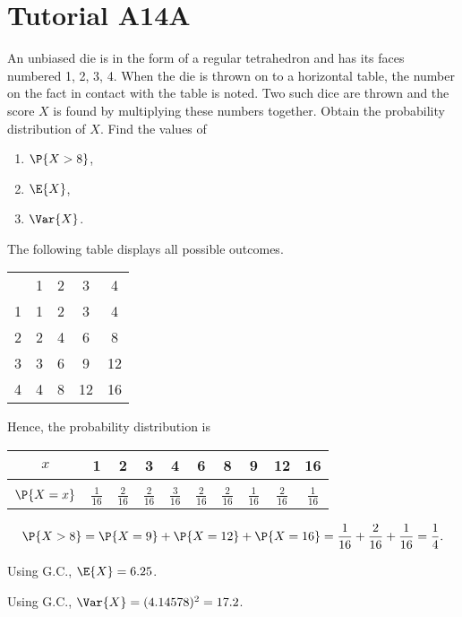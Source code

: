 \section{Tutorial A14A}

\begin{problem}
    An unbiased die is in the form of a regular tetrahedron and has its faces numbered 1, 2, 3, 4. When the die is thrown on to a horizontal table, the number on the fact in contact with the table is noted. Two such dice are thrown and the score $X$ is found by multiplying these numbers together. Obtain the probability distribution of $X$. Find the values of
    \begin{enumerate}
        \item $\P{X > 8}$,
        \item $\E{X}$,
        \item $\Var{X}$.
    \end{enumerate}
\end{problem}
\begin{solution}
    The following table displays all possible outcomes.
    \begin{table}[H]
        \centering
        \begin{tabular}{ccccc}
        & 1 & 2 & 3  & 4  \\ \cline{2-5} 
        \multicolumn{1}{c|}{1} & 1 & 2 & 3  & 4  \\
        \multicolumn{1}{c|}{2} & 2 & 4 & 6  & 8  \\
        \multicolumn{1}{c|}{3} & 3 & 6 & 9  & 12 \\
        \multicolumn{1}{c|}{4} & 4 & 8 & 12 & 16
        \end{tabular}
    \end{table}
    Hence, the probability distribution is
    \begin{table}[H]
        \centering
        \begin{tabular}{|c|c|c|c|c|c|c|c|c|c|}
        \hline
        $x$ & 1 & 2 & 3 & 4 & 6 & 8 & 9 & 12 & 16 \\ \hline
        &&&&&&&&&\\[-1em]
        $\P{X = x}$ & $\frac1{16}$ & $\frac2{16}$ & $\frac2{16}$ & $\frac3{16}$ & $\frac2{16}$ & $\frac2{16}$ & $\frac1{16}$ & $\frac2{16}$ & $\frac1{16}$ \\[0.2em] \hline
        \end{tabular}
    \end{table}

    \begin{ppart}
        \[\P{X > 8} = \P{X = 9} + \P{X = 12} + \P{X = 16} = \frac1{16} + \frac2{16} + \frac1{16} = \frac14.\]
    \end{ppart}
    \begin{ppart}
        Using G.C., $\E{X} = 6.25$.
    \end{ppart}
    \begin{ppart}
        Using G.C., $\Var{X} = (4.14578)^2 = 17.2$.
    \end{ppart}
\end{solution}

